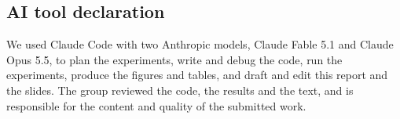 \subsection*{AI tool declaration}

We used Claude Code with two Anthropic models, Claude Fable 5.1 and Claude Opus 5.5, to plan the experiments, write and debug the code, run the experiments, produce the figures and tables, and draft and edit this report and the slides. The group reviewed the code, the results and the text, and is responsible for the content and quality of the submitted work.

